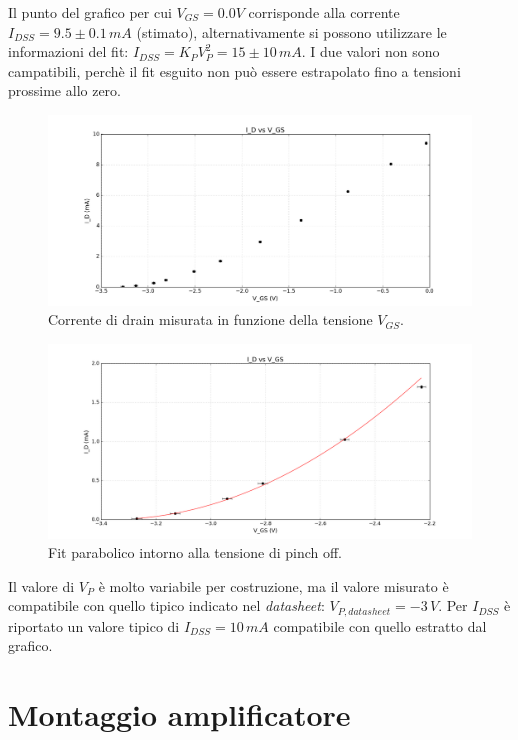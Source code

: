 \documentclass[10pt,a4paper]{article}
\begin{document}
Il punto del grafico per cui $V_{GS} = 0.0V$ corrisponde alla corrente $I_{DSS} = 9.5 \pm 0.1 \, mA $ (stimato), alternativamente si possono utilizzare le informazioni del fit: $I_{DSS} = K_P V_{P}^2 = 15 \pm 10 \, mA$. I due valori non sono campatibili, perchè il fit esguito non può essere estrapolato fino a tensioni prossime allo zero.

\begin{figure}
\centering
\includegraphics[scale=0.5]{parabolaTutti.png}
\caption{Corrente di drain misurata in funzione della tensione $V_{GS}$.\label{tuttiIdati}}
\end{figure}

\begin{figure}
\centering
\includegraphics[scale=0.5]{parabolaFit.png}
\caption{Fit parabolico intorno alla tensione di pinch off.\label{correnteIdVgs}}
\end{figure}

Il valore di $V_P$ è molto variabile per costruzione, ma il valore misurato è compatibile con quello tipico indicato nel \emph{datasheet}: $V_{P, datasheet} = -3 \, V$. Per $I_{DSS}$ è riportato un valore tipico di $I_{DSS} = 10 \, mA$ compatibile con quello estratto dal grafico.

\section{Montaggio amplificatore}
\end{document}
